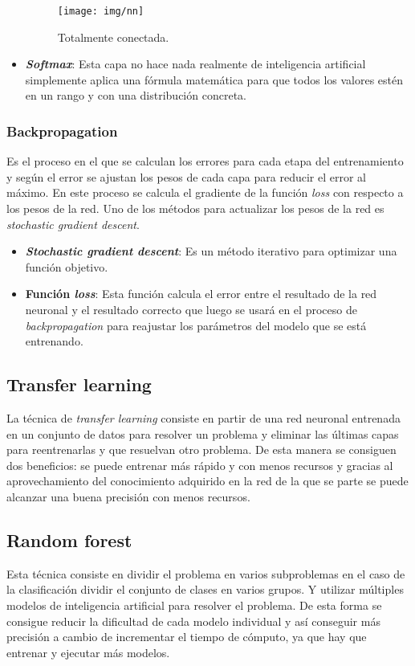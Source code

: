 \documentclass[12pt,a4paper]{article}
\begin{document}
\begin{itemize}
\begin{figure}[H]
\centering
\texttt{[image: img/nn]}
\caption{Totalmente conectada.}
\end{figure}

\item \textbf{\textit{Softmax}}: Esta capa no hace nada realmente de inteligencia artificial simplemente aplica una fórmula matemática para que todos los valores estén en un rango y con una distribución concreta.

\end{itemize}

\subsubsection{Backpropagation}
Es el proceso en el que se calculan los errores para cada etapa del entrenamiento y según el error se ajustan los pesos de cada capa para reducir el error al máximo. En este proceso se calcula el gradiente de la función \textit{loss} con respecto a los pesos de la red. Uno de los métodos para actualizar los pesos de la red es \textit{stochastic gradient descent}.

\begin{itemize}
\item \textbf{\textit{Stochastic gradient descent}}: Es un método iterativo para optimizar una función objetivo.

\item \textbf{Función \textit{loss}}: Esta función calcula el error entre el resultado de la red neuronal y el resultado correcto que luego se usará en el proceso de \textit{backpropagation} para reajustar los parámetros del modelo que se está entrenando.

\end{itemize}

\subsection{Transfer learning}
La técnica de \textit{transfer learning} consiste en partir de una red neuronal entrenada en un conjunto de datos para resolver un problema y eliminar las últimas capas para reentrenarlas y que resuelvan otro problema. De esta manera se consiguen dos beneficios: se puede entrenar más rápido y con menos recursos y gracias al aprovechamiento del conocimiento adquirido en la red de la que se parte se puede alcanzar una buena precisión con menos recursos.

\subsection{Random forest}
Esta técnica consiste en dividir el problema en varios subproblemas en el caso de la clasificación dividir el conjunto de clases en varios grupos. Y utilizar múltiples modelos de inteligencia artificial para resolver el problema. De esta forma se consigue reducir la dificultad de cada modelo individual y así conseguir más precisión a cambio de incrementar el tiempo de cómputo, ya que hay que entrenar y ejecutar más modelos.
\end{document}
